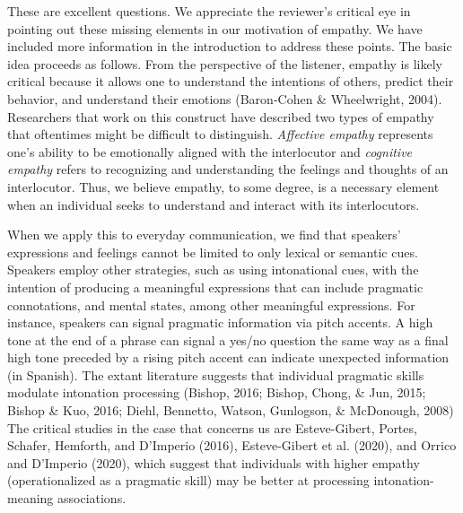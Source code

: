 \documentclass[]{article}
\newcommand{\TaskEstimationBox}[2]{%
\ifoptiondraft{\parbox{1.0\linewidth}{\hfill \hfill {\colorbox{#2}{\color{White} \textbf{#1}}}}}%
{}%
}
\def\Done {\TaskEstimationBox{Done}{Blue}}
\def\Easy {\TaskEstimationBox{Feasible}{ForestGreen}}
\begin{document}
\Done
\Easy


These are excellent questions.
We appreciate the reviewer's critical eye in pointing out these missing elements in our motivation of empathy.
We have included more information in the introduction to address these points.
The basic idea proceeds as follows.
From the perspective of the listener, empathy is likely critical because it allows one to understand the intentions of others, predict their behavior, and understand their emotions (Baron-Cohen \& Wheelwright, 2004).
Researchers that work on this construct have described two types of empathy that oftentimes might be difficult to distinguish.
\emph{Affective empathy} represents one's ability to be emotionally aligned with the interlocutor and \emph{cognitive empathy} refers to recognizing and understanding the feelings and thoughts of an interlocutor.
Thus, we believe empathy, to some degree, is a necessary element when an individual seeks to understand and interact with its interlocutors.

When we apply this to everyday communication, we find that speakers' expressions and feelings cannot be limited to only lexical or semantic cues.
Speakers employ other strategies, such as using intonational cues, with the intention of producing a meaningful expressions that can include pragmatic connotations, and mental states, among other meaningful expressions.
For instance, speakers can signal pragmatic information via pitch accents.
A high tone at the end of a phrase can signal a yes/no question the same way as a final high tone preceded by a rising pitch accent can indicate unexpected information (in Spanish).
The extant literature suggests that individual pragmatic skills modulate intonation processing (Bishop, 2016; Bishop, Chong, \& Jun, 2015; Bishop \& Kuo, 2016; Diehl, Bennetto, Watson, Gunlogson, \& McDonough, 2008)
The critical studies in the case that concerns us are Esteve-Gibert, Portes, Schafer, Hemforth, and D'Imperio (2016), Esteve-Gibert et al. (2020), and Orrico and D'Imperio (2020), which suggest that individuals with higher empathy (operationalized as a pragmatic skill) may be better at processing intonation-meaning associations.
\end{document}
